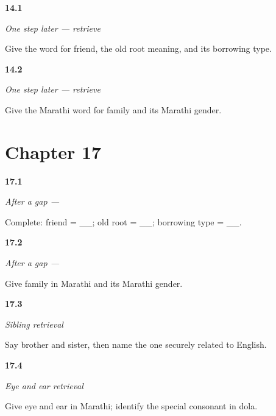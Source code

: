 \noindent\begin{minipage}[t]{\linewidth}
\raggedright
\hypertarget{review-MR-R11-mitra-r1-check}{\textbf{14.1}} \emph{One step later — retrieve }\par
\small Give the word for friend, the old root meaning, and its borrowing type.
\end{minipage}\par\medskip

\noindent\begin{minipage}[t]{\linewidth}
\raggedright
\hypertarget{review-MR-R11-kutumb-r1-check}{\textbf{14.2}} \emph{One step later — retrieve }\par
\small Give the Marathi word for family and its Marathi gender.
\end{minipage}\par\medskip

\section*{Chapter 17}

\noindent\begin{minipage}[t]{\linewidth}
\raggedright
\hypertarget{review-MR-R14-mitra-r2-check}{\textbf{17.1}} \emph{After a gap — }\par
\small Complete: friend = \_\_; old root = \_\_; borrowing type = \_\_.
\end{minipage}\par\medskip

\noindent\begin{minipage}[t]{\linewidth}
\raggedright
\hypertarget{review-MR-R14-kutumb-r2-check}{\textbf{17.2}} \emph{After a gap — }\par
\small Give family in Marathi and its Marathi gender.
\end{minipage}\par\medskip

\noindent\begin{minipage}[t]{\linewidth}
\raggedright
\hypertarget{review-MR-R14-siblings-check}{\textbf{17.3}} \emph{Sibling retrieval}\par
\small Say brother and sister, then name the one securely related to English.
\end{minipage}\par\medskip

\noindent\begin{minipage}[t]{\linewidth}
\raggedright
\hypertarget{review-MR-R14-eye-ear-check}{\textbf{17.4}} \emph{Eye and ear retrieval}\par
\small Give eye and ear in Marathi; identify the special consonant in dola.
\end{minipage}\par\medskip

